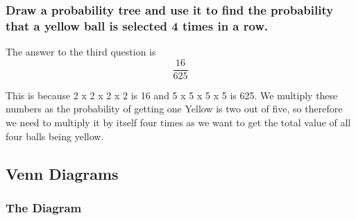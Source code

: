 \documentclass[a4paper,12pt]{article}
\begin{document}
\subsubsection{Draw a probability tree and use it to find the probability that a yellow ball is selected 4 times in a row.}

The answer to the third question is
\[
  \frac{16}{625}
\]

This is because 2 x 2 x 2 x 2 is 16 and 5 x 5 x 5 x 5 is 625. We multiply these numbers as the probability of getting one Yellow is two out of five, so therefore we need to multiply it by itself four times as we want to get the total value of all four balls being yellow.

\newpage

\subsection{Venn Diagrams}

\subsubsection{The Diagram}

\def\firstcircle{(0,0) circle (1.5cm)}
\def\secondcircle{(55:2cm) circle (1.5cm)}
\def\thirdcircle{(0:2cm) circle (1.5cm)}
\def\forthcircle{(5,0.5) circle (1.5cm)}
\end{document}
